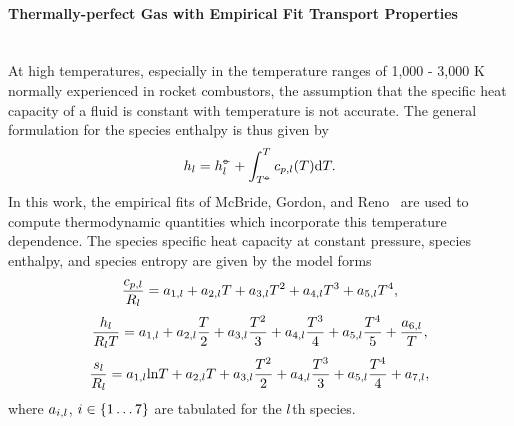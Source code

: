 \paragraph*{Thermally-perfect Gas with Empirical Fit Transport Properties}\mbox{}\\
%
At high temperatures, especially in the temperature ranges of 1,000 - 3,000 K normally experienced in rocket combustors, the assumption that the specific heat capacity of a fluid is constant with temperature is not accurate. The general formulation for the species enthalpy is thus given by
%
\begin{eqnarray}
	h_{l} = h^{\circ\kern-0.47em-}_{l} + \int_{T^{\circ\kern-0.47em-}}^{T} c_{p,l}(T) \text{d}T.
\end{eqnarray}
%
In this work, the empirical fits of McBride, Gordon, and Reno~\cite{McBride1993} are used to compute thermodynamic quantities which incorporate this temperature dependence. The species specific heat capacity at constant pressure, species enthalpy, and species entropy are given by the model forms
%
\begin{equation}
	\frac{c_{p,l}}{R_{l}} = a_{1,l} + a_{2,l} T + a_{3,l} T^2 + a_{4,l} T^3 + a_{5,l} T^4,
\end{equation}
%
\begin{equation}
	\frac{h_{l}}{R_{l} T} = a_{1,l} + a_{2,l} \frac{T}{2} + a_{3,l} \frac{T^2}{3} + a_{4,l} \frac{T^3}{4} + a_{5,l} \frac{T^4}{5} + \frac{a_{6,l}}{T},
\end{equation}
%
\begin{equation}
	\frac{s_{l}}{R_{l}} = a_{1,l} \text{ln}T + a_{2,l} T + a_{3,l} \frac{T^2}{2} + a_{4,l} \frac{T^3}{3} + a_{5,l} \frac{T^4}{4} + a_{7,l},
\end{equation}
%
where $a_{i,l}$, $i \in \{1 \hdots 7\}$ are tabulated for the $l$th species.

